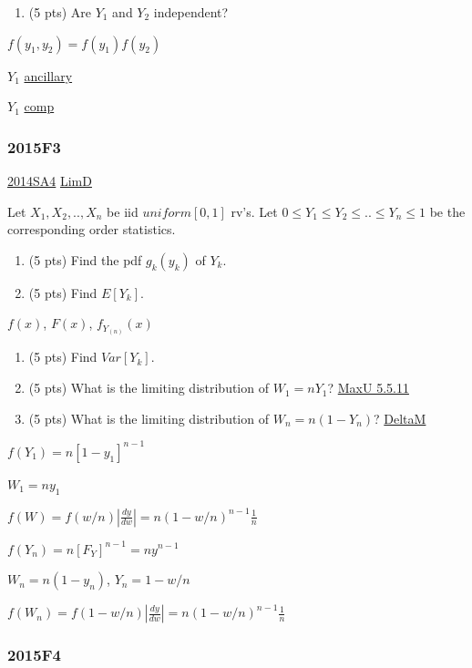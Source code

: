 \documentclass[10pt,twocolumn,portrait]{article}
\providecommand{\tightlist}{%
  \setlength{\itemsep}{0pt}\setlength{\parskip}{0pt}}
\begin{document}
\begin{enumerate}
\def\labelenumi{(\alph{enumi})}
\setcounter{enumi}{2}
\tightlist
\item
  (5 pts) Are \(Y_1\) and \(Y_2\) independent?
\end{enumerate}

\(f(y_1,y_2)=f(y_1)f(y_2)\)

\(Y_1\) \protect\hyperlink{ancillary}{ancillary}

\(Y_1\) \protect\hyperlink{comp}{comp}

\hypertarget{f3-5}{%
\subsubsection{2015F3}\label{f3-5}}

\protect\hyperlink{sa4-2}{2014SA4} \protect\hyperlink{LimD}{LimD}

Let \(X_1,X_2,..,X_{n}\) be iid \(uniform[0,1]\) rv's. Let
\(0\le Y_1\le Y_2\le..\le Y_n\le1\) be the corresponding order
statistics.

\begin{enumerate}
\def\labelenumi{(\alph{enumi})}
\item
  (5 pts) Find the pdf \(g_k(y_k)\) of \(Y_k\).
\item
  (5 pts) Find \(E[Y_k]\).
\end{enumerate}

\(f(x)\), \(F(x)\), \(f_{Y_{(n)}}(x)\)

\begin{enumerate}
\def\labelenumi{(\alph{enumi})}
\setcounter{enumi}{2}
\item
  (5 pts) Find \(Var[Y_k]\).
\item
  (5 pts) What is the limiting distribution of \(W_1=nY_1\)?
  \protect\hyperlink{Max-Unif}{MaxU 5.5.11}
\item
  (5 pts) What is the limiting distribution of \(W_n=n(1-Y_n)\)?
  \protect\hyperlink{DeltaM}{DeltaM}
\end{enumerate}

\(f(Y_1)=n[1-y_1]^{n-1}\)

\(W_1=ny_1\)

\(f(W)=f(w/n)|\frac{dy}{dw}|=n(1-w/n)^{n-1}\frac1{n}\)

\(f(Y_n)=n[F_Y]^{n-1}=ny^{n-1}\)

\(W_n=n(1-y_n)\), \(Y_n=1-w/n\)

\(f(W_n)=f(1-w/n)|\frac{dy}{dw}|=n(1-w/n)^{n-1}\frac1{n}\)

\hypertarget{f4-5}{%
\subsubsection{2015F4}\label{f4-5}}
\end{document}
